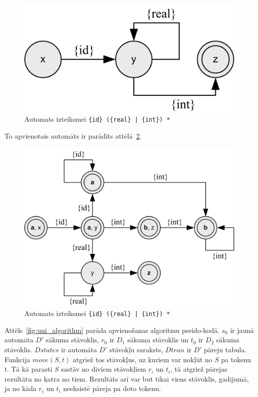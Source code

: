 \begin{figure}[H]
  \centering
    \includegraphics[scale=1.5]{pictures/auto_m_2}
  \caption{\label{fig:auto_m_2}Automats izteiksmei \texttt{\{id\} (\{real\} | \{int\}) *}}
\end{figure}

To apvienotais automāts ir parādīts attēlā~\ref{fig:auto_merge}.

\begin{figure}[H]
  \centering
    \includegraphics[scale=1.5]{pictures/auto_merge}
  \caption{\label{fig:auto_merge}Automats izteiksmei \texttt{\{id\} (\{real\} | \{int\}) *}}
\end{figure}

Attēls~\ref{fig:uni_algorithm} parāda apvienošanas algoritmu pseido-kodā. $s_0$ ir jaunā automāta $D'$ sākuma stāvoklis, $r_0$ ir $D_1$ sākuma stāvoklis un $t_0$ ir $D_2$ sākuma stāvoklis. $Dstates$ ir automāta $D'$ stāvokļu saraksts, $Dtran$ ir $D'$ pāreju tabula. Funkcija $move (S, t)$ atgriež tos stāvokļus, uz kuriem var nokļūt no $S$ pa tokenu $t$. Tā kā parasti $S$ sastāv no diviem stāvokļiem $r_i$ un $t_i$, tā atgriež pārejas rezultātu no katra no tiem. Rezultāts arī var but tikai viens stāvoklis, gadījumā, ja no kāda $r_i$ un $t_i$ neeksistē pāreja pa doto tokenu.

